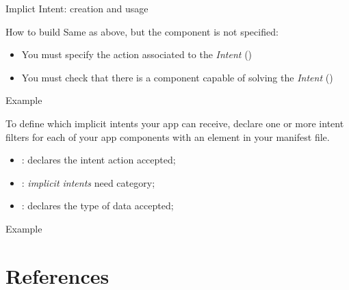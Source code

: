 \documentclass{beamer}
\begin{document}
\begin{frame}{Implict Intent: creation and usage}
  \begin{block}{How to build}
    Same as above, but the component is not specified:
    \begin{itemize}
      \item You must specify the action associated to the \textit{Intent} ()
      \item You must check that there is a component capable of solving the \textit{Intent} ()
    \end{itemize}
  \end{block}
  \begin{exampleblock}{Example}
    
  \end{exampleblock}
  To define which implicit intents your app can receive, declare one or more intent filters
  for each of your app components with an  element in your manifest file.
  \begin{itemize}
    \item {}: declares the intent action accepted;
    \item {}: \textit{implicit intents} need  category; 
    \item {}: declares the type of data accepted;
  \end{itemize}
  \begin{exampleblock}{Example}
    
  \end{exampleblock}
\end{frame}

\section*{References}

\end{document}
